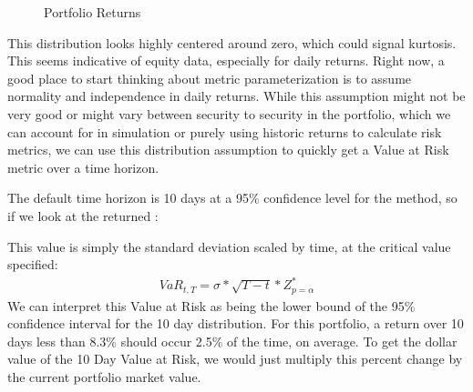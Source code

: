 \documentclass[letterpaper,10pt,english]{sphinxmanual}
\begin{document}
\begin{figure}[htbp]
\centering
\capstart

\noindent{}
\caption{Portfolio Returns}\label{\detokenize{gettingstarted:id2}}\end{figure}

This distribution looks highly centered around zero, which could signal
kurtosis. This seems indicative of equity data, especially for daily
returns. Right now, a good place to start thinking about metric
parameterization is to assume normality and independence in daily
returns. While this assumption might not be very good or might vary
between security to security in the portfolio, which we can account for
in simulation or purely using historic returns to calculate risk
metrics, we can use this distribution assumption to quickly get a Value
at Risk metric over a time horizon.

The default time horizon is 10 days at a 95\% confidence level for the
 method, so if we look at the returned
:

%
\begin{sphinxVerbatim}[commandchars=\\\{\}]
\end{sphinxVerbatim}

This value is simply the standard deviation scaled by time, at the
critical value specified:
\begin{equation*}
\begin{split}VaR_{t, T} = \sigma * \sqrt{T-t} * Z^{*}_{p = \alpha}\end{split}
\end{equation*}
We can interpret this Value at Risk as being the lower bound of the 95\%
confidence interval for the 10 day distribution. For this portfolio, a
return over 10 days less than 8.3\% should occur 2.5\% of the time, on
average. To get the dollar value of the 10 Day Value at Risk, we would
just multiply this percent change by the current portfolio market value.

%
\begin{sphinxVerbatim}[commandchars=\\\{\}]
      
\end{sphinxVerbatim}
\end{document}
